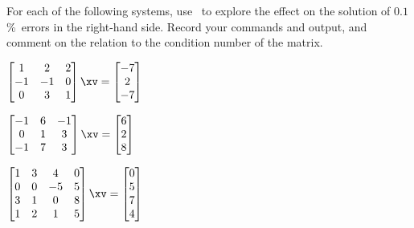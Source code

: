 \begin{exercise}  
For each of the following systems, use \script\ to explore the effect on the solution of \(0.1\)\%~errors in the right-hand side.
Record your commands and output, and comment on the relation to the  condition number of the matrix.

\begin{Parts}

\item \(\begin{bmatrix} 1&2&2
\\-1&-1&0
\\0&3&1 \end{bmatrix}\xv
=\begin{bmatrix} -7
\\2
\\-7 \end{bmatrix}\)
\setbox\ajrqrbox\hbox{}%
\marginajrbox%

\begin{reduce}
\item \(\begin{bmatrix} -1&6&-1
\\0&1&3
\\-1&7&3 \end{bmatrix}\xv
=\begin{bmatrix} 6
\\2
\\8 \end{bmatrix}\)
\setbox\ajrqrbox\hbox{}%
\marginajrbox%

\item \(\begin{bmatrix} 1&3&4&0
\\0&0&-5&5
\\3&1&0&8
\\1&2&1&5 \end{bmatrix}\xv
=\begin{bmatrix} 0
\\5
\\7
\\4 \end{bmatrix}\)
\setbox\ajrqrbox\hbox{}%
\marginajrbox%
\end{reduce}


\end{Parts}
\end{exercise}
